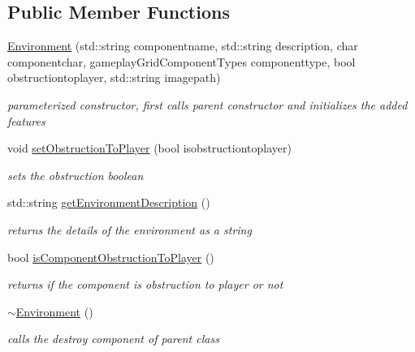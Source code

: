 \subsection*{Public Member Functions}
\begin{DoxyCompactItemize}
\item 
\hypertarget{class_environment_aa8343da91ebb48313d00baefe2c993a4}{}\label{class_environment_aa8343da91ebb48313d00baefe2c993a4} 
\hyperlink{class_environment_aa8343da91ebb48313d00baefe2c993a4}{Environment} (std\+::string componentname, std\+::string description, char componentchar, gameplay\+Grid\+Component\+Types componenttype, bool obstructiontoplayer, std\+::string imagepath)
\begin{DoxyCompactList}\small\item\em parameterized constructor, first calls parent constructor and initializes the added features \end{DoxyCompactList}\item 
\hypertarget{class_environment_a01c5f648a057546973596b9e5336bf86}{}\label{class_environment_a01c5f648a057546973596b9e5336bf86} 
void \hyperlink{class_environment_a01c5f648a057546973596b9e5336bf86}{set\+Obstruction\+To\+Player} (bool isobstructiontoplayer)
\begin{DoxyCompactList}\small\item\em sets the obstruction boolean \end{DoxyCompactList}\item 
\hypertarget{class_environment_a930634cbf36d2840f74d025253722dbf}{}\label{class_environment_a930634cbf36d2840f74d025253722dbf} 
std\+::string \hyperlink{class_environment_a930634cbf36d2840f74d025253722dbf}{get\+Environment\+Description} ()
\begin{DoxyCompactList}\small\item\em returns the details of the environment as a string \end{DoxyCompactList}\item 
\hypertarget{class_environment_a7427445e57ccdb66b13ede6ed151263c}{}\label{class_environment_a7427445e57ccdb66b13ede6ed151263c} 
bool \hyperlink{class_environment_a7427445e57ccdb66b13ede6ed151263c}{is\+Component\+Obstruction\+To\+Player} ()
\begin{DoxyCompactList}\small\item\em returns if the component is obstruction to player or not \end{DoxyCompactList}\item 
\hypertarget{class_environment_a8e294735187880dd3d59be10c425b29d}{}\label{class_environment_a8e294735187880dd3d59be10c425b29d} 
\hyperlink{class_environment_a8e294735187880dd3d59be10c425b29d}{$\sim$\+Environment} ()
\begin{DoxyCompactList}\small\item\em calls the destroy component of parent class \end{DoxyCompactList}\end{DoxyCompactItemize}
